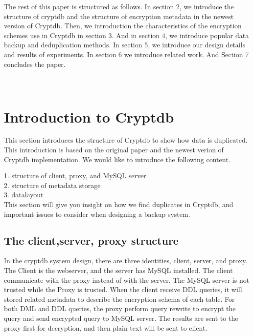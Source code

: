 The rest of this paper is structured as follows. In section 2, we introduce the structure of cryptdb and the structure of encryption metadata in the newest version of Cryptdb. Then, we introduction the characteristics of the encryption schemes use in Cryptdb in section 3. And in section 4, we introduce popular data backup and deduplication methods. In section 5, we introduce our design details and results of experiments. In section 6 we introduce related work. And Section 7 concludes the paper.
\\ \\ \\ 





\section{Introduction to Cryptdb}

This section introduces the structure of Cryptdb to show how data is duplicated. This introduction is based on the original paper and the newest verion of Cryptdb implementation. We would like to introduce the following content.

1. structure of client, proxy, and MySQL server\\
2. structure of metadata storage\\
3. datalayout \\

This section will give you insight on how we find duplicates in Cryptdb, and important issues to consider when designing a backup system.

\subsection{The client,server, proxy structure}

In the cryptdb system design, there are three identities, client, server, and proxy. The Client is the webserver, and the server has MySQL installed. The client communicate with the proxy instead of with the server. The MySQL server is not trusted while the Proxy is trusted. When the client receive DDL queries, it will stored related metadata to describe the encryption schema of each table. For both DML and DDL queries, the proxy perform query rewrite to encrypt the query and send encrypted query to MySQL server. The results are sent to the proxy first for decryption, and then plain text will be sent to client.


